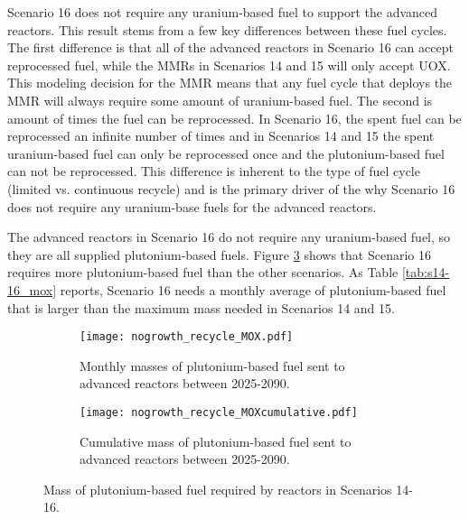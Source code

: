 Scenario 16 does not require any uranium-based fuel to support the 
advanced reactors. This result stems from a few key differences between 
these fuel cycles. The first difference is that all of the advanced 
reactors in Scenario 16 can accept reprocessed fuel, while the \glspl{MMR} 
in Scenarios 14 and 15 will only accept \gls{UOX}. This modeling 
decision for the \gls{MMR} means that any fuel cycle that 
deploys the \gls{MMR} will always require some amount of uranium-based 
fuel. The second is amount of times the fuel can be reprocessed. 
In Scenario 16, the spent fuel can be reprocessed an infinite number 
of times and in Scenarios 14 and 15 the spent uranium-based fuel can 
only be reprocessed once and the plutonium-based fuel can not be 
reprocessed. This difference is inherent to the type of fuel cycle 
(limited vs. continuous recycle) and is the primary driver of the 
why Scenario 16 does not require any uranium-base fuels for the 
advanced reactors. 

The advanced reactors in Scenario 16 do not require any uranium-based fuel, 
so they are all supplied plutonium-based fuels. Figure 
\ref{fig:nogrowth_recycle_mox} shows that Scenario 16 requires more 
plutonium-based fuel than the other scenarios. As Table 
\ref{tab:s14-16_mox} reports, Scenario 16 needs a monthly average 
of plutonium-based fuel that is larger than the maximum mass 
needed in Scenarios 14 and 15. 

\begin{figure}[h!]
    \centering
    \begin{subfigure}[b]{0.45\textwidth}
        \centering
        \texttt{[image: nogrowth\_recycle\_MOX.pdf]}
        \caption{Monthly masses of plutonium-based fuel sent to 
        advanced reactors between 2025-2090.}
        \label{fig:nogrowth_recycle_AR_mox}
    \end{subfigure}
    \hfill
    \begin{subfigure}[b]{0.45\textwidth}
        \centering
        \texttt{[image: nogrowth\_recycle\_MOXcumulative.pdf]}
        \caption{Cumulative mass of plutonium-based fuel
        sent to advanced reactors between 2025-2090.}
        \label{fig:nogrowth_recycle_mox_cumulative}
    \end{subfigure}
       \caption{Mass of plutonium-based fuel required by reactors
        in Scenarios 14-16.}
       \label{fig:nogrowth_recycle_mox}
\end{figure}

